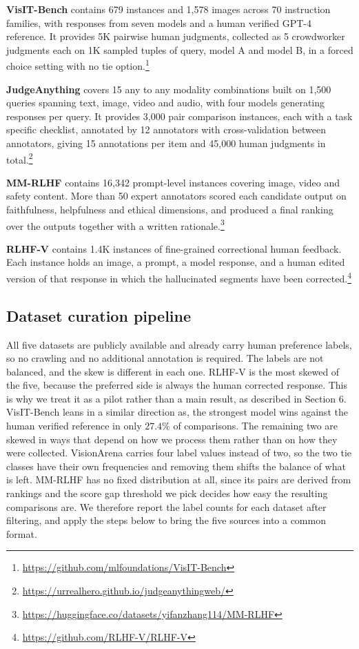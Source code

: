 \documentclass[11pt,a4paper]{article}
\begin{document}
\textbf{VisIT-Bench} \citep{bitton2023visit} contains 679 instances and 1,578 images across
70 instruction families, with responses from seven models and a human verified GPT-4
reference. It provides 5K pairwise human judgments, collected as 5 crowdworker judgments
each on 1K sampled tuples of query, model A and model B, in a forced choice setting with no
tie option.\footnote{\url{https://github.com/mlfoundations/VisIT-Bench}}

\textbf{JudgeAnything} \citep{pu2025judgeanything} covers 15 any to any modality
combinations built on 1,500 queries spanning text, image, video and audio, with four models
generating responses per query. It provides 3,000 pair comparison instances, each with a
task specific checklist, annotated by 12 annotators with cross-validation
between annotators, giving 15 annotations per item and 45,000 human judgments in
total.\footnote{\url{https://urrealhero.github.io/judgeanythingweb/}}

\textbf{MM-RLHF} \citep{zhang2025mmrlhf} contains 16,342 prompt-level instances covering
image, video and safety content. More than 50 expert annotators scored each candidate
output on faithfulness, helpfulness and ethical dimensions, and produced a final ranking
over the outputs together with a written rationale.\footnote{\url{https://huggingface.co/datasets/yifanzhang114/MM-RLHF}}

\textbf{RLHF-V} \citep{yu2024rlhfv} contains 1.4K instances of fine-grained correctional
human feedback. Each instance holds an image, a prompt, a model response, and a human
edited version of that response in which the hallucinated segments have been
corrected.\footnote{\url{https://github.com/RLHF-V/RLHF-V}}

\subsection{Dataset curation pipeline}

All five datasets are publicly available and already carry human preference labels, so no
crawling and no additional annotation is required. The labels are not balanced, and
the skew is different in each one. RLHF-V is the most skewed of the five, because the preferred side is
always the human corrected response. This is why we treat it as a pilot rather than a main result,
as described in Section 6. VisIT-Bench leans in a similar direction as, the strongest model wins against the human verified reference in only $27.4\%$ of
comparisons. The remaining two are skewed in ways that depend on how we
process them rather than on how they were collected. VisionArena carries four label values
instead of two, so the two tie classes have their own frequencies and removing them shifts
the balance of what is left. MM-RLHF has no fixed distribution at all, since its pairs are
derived from rankings and the score gap threshold we pick decides how easy the resulting
comparisons are. We therefore report the label counts for each dataset after filtering, and
apply the steps below to bring the five sources into a common format.
\end{document}
